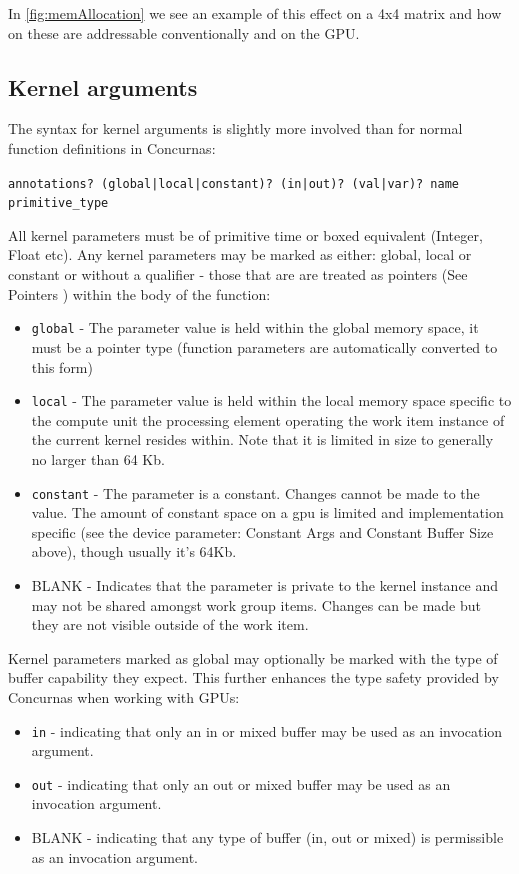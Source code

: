 \documentclass[conc-doc]{subfiles}
\begin{document}
In \ref{fig:memAllocation} we see an example of this effect on a 4x4 matrix and how on these are addressable conventionally and on the GPU.

\subsection{Kernel arguments}
The syntax for kernel arguments is slightly more involved than for normal function definitions in Concurnas:

\begin{center}
	\lstinline{annotations? (global|local|constant)? (in|out)? (val|var)? name primitive_type}
\end{center}

All kernel parameters must be of primitive time or boxed equivalent (Integer, Float etc). Any kernel parameters may be marked as either: global, local or constant or without a qualifier - those that are are treated as pointers (See Pointers ) within the body of the function:

\begin{itemize}
	\item \lstinline{global} - The parameter value is held within the global memory space, it must be a pointer type (function parameters are automatically converted to this form)
	\item \lstinline{local} - The parameter value is held within the local memory space specific to the compute unit the processing element operating the work item instance of the current kernel resides within. Note that it is limited in size to generally no larger than 64 Kb.
	\item \lstinline{constant} - The parameter is a constant. Changes cannot be made to the value. The amount of constant space on a gpu is limited and implementation specific (see the device parameter: Constant Args and Constant Buffer Size above), though usually it's 64Kb.
	\item BLANK - Indicates that the parameter is private to the kernel instance and may not be shared amongst work group items. Changes can be made but they are not visible outside of the work item.
\end{itemize}

Kernel parameters marked as global may optionally be marked with the type of buffer capability they expect. This further enhances the type safety provided by Concurnas when working with GPUs:

\begin{itemize}
	\item \lstinline{in} - indicating that only an in or mixed buffer may be used as an invocation argument.
	\item \lstinline{out} - indicating that only an out or mixed buffer may be used as an invocation argument.
	\item BLANK - indicating that any type of buffer (in, out or mixed) is permissible as an invocation argument.
\end{itemize}
\end{document}
